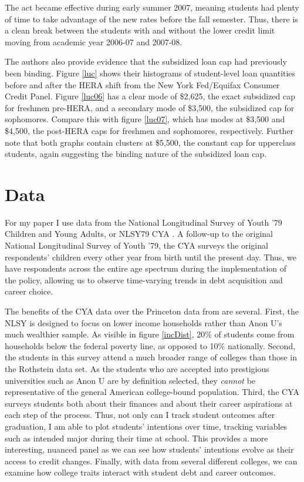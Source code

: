 \documentclass[12pt]{article}
\begin{document}
	The act became effective during early summer 2007, meaning students had plenty of time to take advantage of the new rates before the fall semester. Thus, there is a clean break between the students with and without the lower credit limit moving from academic year 2006-07 and 2007-08.
	
	The authors also provide evidence that the subsidized loan cap had previously been binding. Figure \ref{luc} shows their histograms of student-level loan quantities before and after the HERA shift from the New York Fed/Equifax Consumer Credit Panel. Figure \ref{luc06} has a clear mode of \$2,625, the exact subsidized cap for freshmen pre-HERA, and a secondary mode of \$3,500, the subsidized cap for sophomores. Compare this with figure \ref{luc07}, which has modes at \$3,500 and \$4,500, the post-HERA caps for freshmen and sophomores, respectively. Further note that both graphs contain clusters at \$5,500, the constant cap for upperclass students, again suggesting the binding nature of the subsidized loan cap. 
	
	
	\section{Data}
	
	For my paper I use data from the National Longitudinal Survey of Youth '79 Children and Young Adults, or NLSY79 CYA \parencite{bls2018}. A follow-up to the original National Longitudinal Survey of Youth '79, the CYA surveys the original respondents' children every other year from birth until the present day. Thus, we have respondents across the entire age spectrum during the implementation of the policy, allowing us to observe time-varying trends in debt acquisition and career choice. 
	
	The benefits of the CYA data over the Princeton data from \textcite{rothstein2011} are several. First, the NLSY is designed to focus on lower income households rather than Anon U's much wealthier sample. As visible in figure \ref{incDist}, 20\% of students come from households below the federal poverty line, as opposed to 10\% nationally. Second, the students in this survey attend a much broader range of colleges than those in the Rothstein data set. As the students who are accepted into prestigious universities such as Anon U are by definition selected, they \emph{cannot} be representative of the general American college-bound population. Third, the CYA surveys students both about their finances and about their career aspirations at each step of the process. Thus, not only can I track student outcomes after graduation, I am able to plot students' intentions over time, tracking variables such as intended major during their time at school. This provides a more interesting, nuanced panel as we can see how students' intentions evolve as their access to credit changes. Finally, with data from several different colleges, we can examine how college traits interact with student debt and career outcomes. 
	
\end{document}
